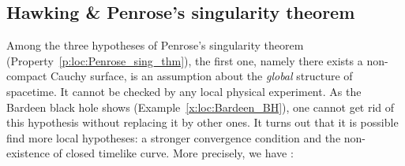 \subsection{Hawking \& Penrose's singularity theorem}

Among the three hypotheses of Penrose's singularity theorem (Property~\ref{p:loc:Penrose_sing_thm}),
the first one, namely there exists a non-compact Cauchy surface, is an assumption about the \emph{global} structure of spacetime. It cannot be checked by any local physical experiment.
As the Bardeen black hole shows (Example~\ref{x:loc:Bardeen_BH}), one cannot get rid of this hypothesis
without replacing it by other ones.
It turns out that it is possible find more local hypotheses:
a stronger convergence condition and the non-existence of closed timelike curve.
More precisely, we have \cite{HawkiP70}:

